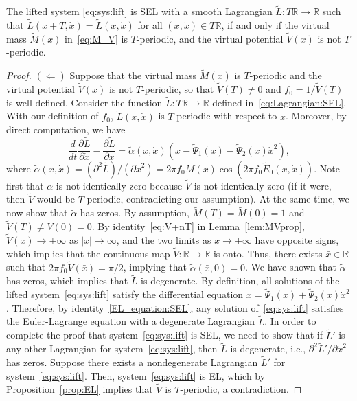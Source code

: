 \begin{proposition}
	\label{prop:SEL}
	The lifted system \eqref{eq:sys:lift} is SEL with a smooth Lagrangian
	$\tilde L : T \mathbb{R} \to \mathbb{R}$ such that $\tilde L(x+T,\dot{x})=\tilde
	L(x,\dot{x})$ for all $(x,\dot{x})\in T \mathbb{R}$, if and only if the
	virtual mass $\tilde{M}(x)$ in~\eqref{eq:M_V} is $T$-periodic, and the
	virtual potential $\tilde{V}(x)$ is not $T$-periodic.
\end{proposition}
\begin{proof}
	$(\Leftarrow)$ Suppose that the virtual mass $\tilde{M}(x)$ is
	$T$-periodic and the virtual potential $\tilde{V}(x)$ is not
	$T$-periodic, so that $\tilde V(T)\neq 0$ and $f_0 = 1/ \tilde V(T)$
	is well-defined. Consider the function $\tilde L : T \mathbb{R} \to \mathbb{R}$
	defined in~\eqref{eq:Lagrangian:SEL}.  With our definition of $f_0$,
	$\tilde L(x,\dot x)$ is $T$-periodic with respect to $x$. Moreover,
	by direct computation, we have
				\begin{equation}\label{EL_equation:SEL}
	\frac{d}{dt} \frac{\partial \tilde L}{\partial \dot x} -
	\frac{\partial \tilde L}{\partial x} = \tilde \alpha(x,\dot x) \left( \ddot x
	- \tilde \Psi_1(x) - \tilde \Psi_2(x) \dot x^2 \right),
	\end{equation}
				where $\tilde \alpha(x,\dot x)= (\partial^2 \tilde L) / (\partial \dot
	x^2) = 2 \pi f_0 \tilde M(x) \cos(2 \pi f_0 \tilde E_0(x,\dot
	x))$. Note first that $\tilde \alpha$ is not identically zero because
	$\tilde V$ is not identically zero (if it were, then $\tilde V$ would
	be $T$-periodic, contradicting our assumption). At the same time, we
	now show that $\tilde \alpha$ has zeros. By assumption, $\tilde
	M(T)=\tilde M(0) =1$ and $\tilde V(T) \neq V(0) =0$. By
	identity~\eqref{eq:V+nT} in Lemma~\ref{lem:MVprop}, $\tilde V(x) \to
	\pm \infty$ as $|x| \to \infty$, and the two limits as $x \to \pm
	\infty$ have opposite signs, which implies that the continuous map
	$\tilde V :\mathbb{R} \to \mathbb{R}$ is onto. Thus, there exists $\bar x \in \mathbb{R}$
	such that $2 \pi f_0 \tilde V(\bar x) = \pi/2$, implying that $\tilde
	\alpha(\bar x,0) =0$. We have shown that $\tilde \alpha$ has zeros,
	which implies that $\tilde L$ is degenerate. By definition, all
	solutions of the lifted system~\eqref{eq:sys:lift} satisfy the
	differential equation $\ddot x = \tilde \Psi_1(x) + \tilde \Psi_2(x)
	\dot x^2$. Therefore, by identity~\eqref{EL_equation:SEL}, any
	solution of~\eqref{eq:sys:lift} satisfies the Euler-Lagrange equation
	with a degenerate Lagrangian $\tilde L$. In order to complete the
	proof that system~\eqref{eq:sys:lift} is SEL, we need to show that if
	$\tilde L'$ is any other Lagrangian for system~\eqref{eq:sys:lift},
	then $\tilde L$ is degenerate, i.e., $\partial^2 \tilde L' / \partial
	\dot x^2$ has zeros. Suppose there exists a nondegenerate Lagrangian
	$\tilde L'$ for system~\eqref{eq:sys:lift}. Then,
	system~\eqref{eq:sys:lift} is EL, which by Proposition~\ref{prop:EL}
	implies that $\tilde V$ is $T$-periodic, a contradiction.
	

\end{proof}

